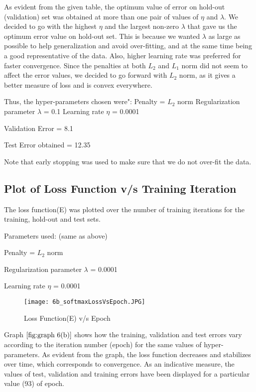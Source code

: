 \documentclass{article}
\begin{document}
As evident from the given table, the optimum value of error on hold-out (validation) set was obtained at more than one pair of values of $\eta$ and $\lambda$. We decided to go with the highest $\eta$ and the largest non-zero $\lambda$ that gave us the optimum error value on hold-out set. This is because we wanted $\lambda$ as large as possible to help generalization and avoid over-fitting, and at the same time being a good representative of the data. Also, higher learning rate was preferred for faster convergence. Since the penalties at both $L_{2}$ and $L_{1}$ norm did not seem to affect the error values, we decided to go forward with $L_{2}$ norm, as it gives a better measure of loss and is convex everywhere.

Thus, the hyper-parameters chosen were":
Penalty = $L_{2}$ norm
Regularization parameter $\lambda$ = 0.1
Learning rate $\eta$ = 0.0001

Validation Error = 8.1%

Test Error obtained = 12.35%

Note that early stopping was used to make sure that we do not over-fit the data.
 
\subsection{Plot of Loss Function v/s Training Iteration}

The loss function(E) was plotted over the number of training iterations for the training, hold-out and test sets. 

Parameters used: (same as above)

Penalty = $L_{2}$ norm

Regularization parameter $\lambda$ = 0.0001

Learning rate $\eta$ = 0.0001

\begin{figure}
  \texttt{[image: 6b\_softmaxLossVsEpoch.JPG]}
  \caption{Loss Function(E) v/s Epoch}
  \label{fig:graph 6(b)}
\end{figure}

Graph $\ref{fig:graph 6(b)}$ shows how the training, validation and test errors vary according to the iteration number (epoch) for the same values of hyper-parameters. As evident from the graph, the loss function decreases and stabilizes over time, which corresponds to convergence. As an indicative measure, the values of test, validation and training errors have been displayed for a particular value (93) of epoch.
\end{document}
